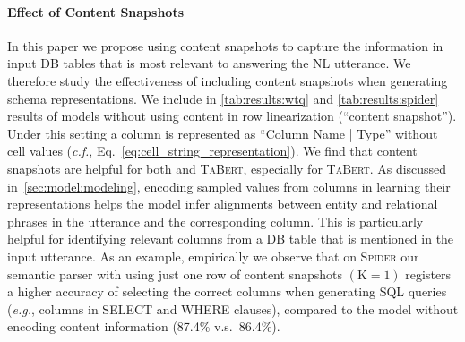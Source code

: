 \documentclass[11pt,a4paper]{article}
\def\model/{\textsc{TaBert}}
\def\modelbase/{}
\def\bert/{}
\newcommand{\CS}[1]{\ensuremath{\mathrm{(K=#1)}}}
\renewcommand{\tt}[1]{\fontfamily{cmtt}\selectfont #1}
\newcommand{\eg}{\hbox{\emph{e.g.}}\xspace}
\def\spider/{\textsc{Spider}}
\begin{document}
\paragraph{Effect of Content Snapshots} 
In this paper we propose using content snapshots to capture the information in input DB tables that is most relevant to answering the NL utterance.
We therefore study the effectiveness of including content snapshots when generating schema representations. 
We include in \autoref{tab:results:wtq} and \autoref{tab:results:spider} results of models without using content in row linearization (``content snapshot'').
Under this setting a column is represented as ``{\tt Column Name | Type}'' without cell values (\textit{c.f.}, Eq.~\eqref{eq:cell_string_representation}).
We find that content snapshots are helpful for both \bert/ and \model/, especially for \model/.
As discussed in~\autoref{sec:model:modeling}, encoding sampled values from columns in learning their representations helps the model infer alignments between entity and relational phrases in the utterance and the corresponding  column.
This is particularly helpful for identifying relevant columns from a DB table that is mentioned in the input utterance.
As an example, empirically we observe that on \spider/ our semantic parser with \modelbase/ using just one row of content snapshots \CS{1} registers a higher accuracy of selecting the correct columns when generating SQL queries (\eg, columns in {\tt SELECT} and {\tt WHERE} clauses), compared to the \modelbase/ model without encoding content information (87.4\% v.s.~86.4\%).
\end{document}
